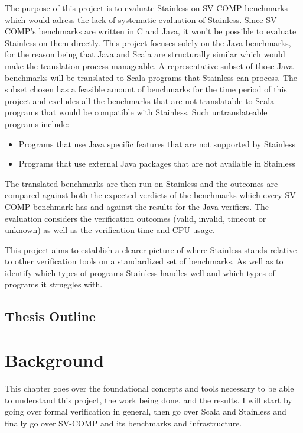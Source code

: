 \documentclass[11pt,titlepage,openright]{book}
\begin{document}
The purpose of this project is to evaluate Stainless on SV-COMP 
benchmarks which would adress the lack of systematic evaluation
of Stainless. Since SV-COMP's benchmarks are written in C and Java, it won't
be possible to evaluate Stainless on them directly. This project focuses solely on the
Java benchmarks, for the reason being that Java and Scala are structurally similar which
would make the translation process manageable. A representative subset of those Java
benchmarks will be translated to Scala programs that Stainless can process. The subset
chosen has a feasible amount of benchmarks for the time period of this project
and excludes all the benchmarks that are not translatable to Scala programs
that would be compatible with Stainless. Such untranslateable programs include:
\begin{itemize} 
  \item Programs that use Java specific features that are not supported by Stainless
  \item Programs that use external Java packages that are not available in Stainless
\end{itemize}

The translated benchmarks are then run on Stainless and the outcomes
are compared against both the expected verdicts of the benchmarks
which every SV-COMP benchmark has and against the results 
for the Java verifiers. The evaluation considers the verification outcomes
(valid, invalid, timeout or unknown) as well as the verification time
and CPU usage.

This project aims to establish a clearer picture of where Stainless stands
relative to other verification tools on a standardized set of benchmarks.
As well as to identify which types of programs Stainless handles well
and which types of programs it struggles with.

\section{Thesis Outline}
\label{sec:thesis-outline}


\chapter{Background}
\label{cha:background}
This chapter goes over the foundational concepts
and tools necessary to be able to understand this project, the
work being done, and the results. I will start by going over formal
verification in general, then go over Scala and Stainless and
finally go over SV-COMP and its benchmarks and infrastructure.
\end{document}
